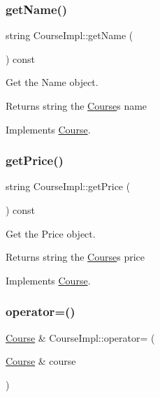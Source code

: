 \subsubsection{\texorpdfstring{get\+Name()}{getName()}}
{\footnotesize\ttfamily string Course\+Impl\+::get\+Name (\begin{DoxyParamCaption}{ }\end{DoxyParamCaption}) const\hspace{0.3cm}{\ttfamily [virtual]}}



Get the Name object. 

\begin{DoxyReturn}{Returns}
string the \hyperlink{classCourse}{Course}\textquotesingle{}s name 
\end{DoxyReturn}


Implements \hyperlink{classCourse_aaf464936166f94c89b97671798996088}{Course}.

\mbox{\label{classCourseImpl_a0b7ff83c24bd1d8e7a6d10b6b89883cd}} 
\subsubsection{\texorpdfstring{get\+Price()}{getPrice()}}
{\footnotesize\ttfamily string Course\+Impl\+::get\+Price (\begin{DoxyParamCaption}{ }\end{DoxyParamCaption}) const\hspace{0.3cm}{\ttfamily [virtual]}}



Get the Price object. 

\begin{DoxyReturn}{Returns}
string the \hyperlink{classCourse}{Course}\textquotesingle{}s price 
\end{DoxyReturn}


Implements \hyperlink{classCourse_a7046438034cb468602eecf2c02013c00}{Course}.

\mbox{\label{classCourseImpl_a2a35e597103c55fd43b68e78c76952e6}} 
\subsubsection{\texorpdfstring{operator=()}{operator=()}}
{\footnotesize\ttfamily \hyperlink{classCourse}{Course} \& Course\+Impl\+::operator= (\begin{DoxyParamCaption}\item[{\hyperlink{classCourse}{Course} \&}]{course }\end{DoxyParamCaption})\hspace{0.3cm}{\ttfamily [virtual]}}



